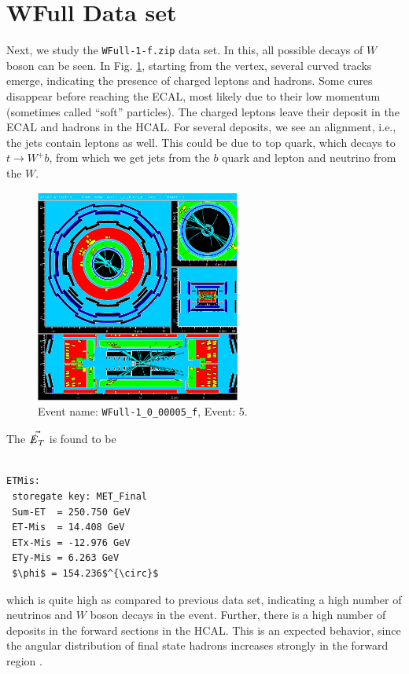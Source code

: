 \documentclass[a4paper]{report}
\numberwithin{equation}{section}
\begin{document}
\section{WFull Data set}

Next, we study the \texttt{WFull-1-f.zip} data set. In this, all possible decays of $W$ boson can be seen. In Fig. \ref{fig:wfull}, starting from the vertex, several curved tracks emerge, indicating the presence of charged leptons and hadrons. Some cures disappear before reaching the ECAL, most likely due to their low momentum (sometimes called ``soft'' particles). The charged leptons leave their deposit in the ECAL and hadrons in the HCAL. For several deposits, we see an alignment, i.e., the jets contain leptons as well. This could be due to top quark, which decays to $t \rightarrow W^+ b$, from which we get jets from the $b$ quark and lepton and neutrino from the $W$. 

\begin{figure}[htpb]
    \centering
    \includegraphics[width=0.6\textwidth]{WFull-1_0_00005_f-YX-RZ-RZ-YX-2022-05-23-13-21-03}
    \caption{Event name: \texttt{WFull-1\_0\_00005\_f}, Event: 5.}
    \label{fig:wfull}
\end{figure}

The $\vec{\slashed{E}_T}$ is found to be 

\begin{lstlisting}

ETMis:
 storegate key: MET_Final
 Sum-ET  = 250.750 GeV
 ET-Mis  = 14.408 GeV
 ETx-Mis = -12.976 GeV
 ETy-Mis = 6.263 GeV
 $\phi$ = 154.236$^{\circ}$
\end{lstlisting}
which is quite high as compared to previous data set, indicating a high number of neutrinos and $W$ boson decays in the event. Further, there is a high number of deposits in the forward sections in the HCAL. This is an expected behavior, since the angular distribution of final state hadrons increases strongly in the forward region \cite{labman}. 
\end{document}
